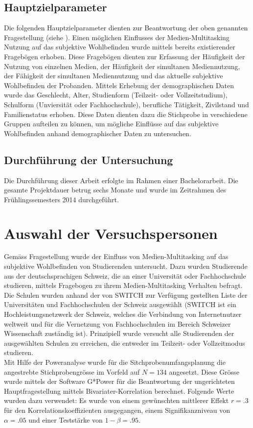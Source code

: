 \subsection{Hauptzielparameter}\label{subsection.hauptzielparameter}
Die folgenden Hauptzielparameter dienten zur Beantwortung der oben genannten Fragestellung (siehe ). Einen möglichen Einflusses der Medien-Multitasking Nutzung auf das subjektive Wohlbefinden wurde mittels bereits existierender Fragebögen erhoben. Diese Fragebögen dienten zur Erfassung der Häufigkeit der Nutzung von einzelnen Medien, der Häufigkeit der simultanen Mediennutzung, der Fähigkeit der simultanen Mediennutzung und das aktuelle subjektive Wohlbefinden der Probanden. Mittels Erhebung der demographischen Daten wurde das Geschlecht, Alter, Studienform (Teilzeit- oder Vollzeitstudium), Schulform (Unviersität oder Fachhochschule), berufliche Tätigkeit, Zivilstand und Familienstatus erhoben. Diese Daten dienten dazu die Stichprobe in verschiedene Gruppen aufteilen zu können, um mögliche Einflüsse auf das subjektive Wohlbefinden anhand demographischer Daten zu untersuchen.

\subsection{Durchführung der Untersuchung}
Die Durchführung dieser Arbeit erfolgte im Rahmen einer Bachelorarbeit. Die gesamte Projektdauer betrug sechs Monate und wurde im Zeitrahmen des Frühlingssemesters 2014 durchgeführt.

\section{Auswahl der Versuchspersonen}\label{section.auswahlVersuchsp}
Gemäss Fragestellung wurde der Einfluss von Medien-Multitasking auf das subjektive Wohlbefinden von Studierenden untersucht. Dazu wurden Studierende aus der deutschsprachigen Schweiz, die an einer Universität oder Fachhochschule studieren, mittels Fragebogen zu ihrem Medien-Multitasking Verhalten befragt. Die Schulen wurden anhand der von SWITCH \cite{Switch2014} zur Verfügung gestellten Liste der Universitäten und Fachhochschulen der Schweiz ausgewählt (SWITCH ist ein Hochleistungsnetzwerk der Schweiz, welches die Verbindung von Internetnutzer weltweit und für die Vernetzung von Fachhochschulen im Bereich Schweizer Wissenschaft zuständig ist). Prinzipiell wurde versucht alle Studierenden der ausgewählten Schulen zu erreichen, die entweder im Teilzeit- oder Vollzeitmodus studieren. \\
Mit Hilfe der Poweranalyse \cite{Faul2009} wurde für die Sitchprobenumfangsplanung die angestrebte  Stichprobengrösse im Vorfeld auf $N = 134$ angesetzt. Diese Grösse wurde mittels der Software G*Power \cite{Gpower2014} für die Beantwortung der ungerichteten Hauptfragestellung mittels Bivariater-Korrelation berechnet. Folgende Werte wurden dazu verwendet: Es wurde von einem gewünschten mittlerer Effekt $r = .3$  \cite{Cohen1988} für den Korrelationskoeffizienten ausgegangen, einem Signifikanzniveau von $\alpha=.05$ und einer Teststärke von $1-\beta=.95$.
